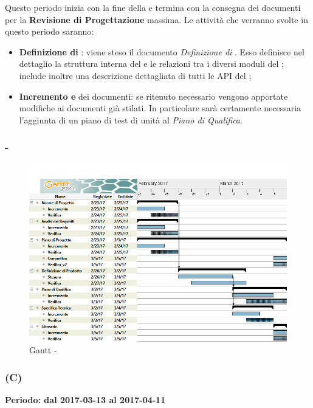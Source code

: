 \documentclass[./PianoDiProgetto.tex]{subfiles}
\begin{document}
  Questo periodo inizia con la fine della \PerPA{} e termina con la consegna dei documenti per la \textbf{Revisione di Progettazione} massima. Le attività che verranno svolte in questo periodo saranno:
  \begin{itemize}
    \item \textbf{Definizione di }: viene steso il documento \textit{Definizione di }. Esso definisce nel dettaglio la struttura interna del  e le relazioni tra i diversi moduli del ; include inoltre una descrizione dettagliata di tutti le API del ;
    \item \textbf{Incremento e } dei documenti: se ritenuto necessario vengono apportate modifiche ai documenti già stilati. In particolare sarà certamente necessaria l'aggiunta di un piano di test di unità al \textit{Piano di Qualifica}.
  \end{itemize}

  \newpage
  \subsubsection{ - \PerPD}
    \begin{figure}[!h]
    \centering
    \includegraphics[width=\textwidth]{images/PD}
    \caption{Gantt - \PerPD}
    \end{figure}

  \subsubsection{\PerC{} (C)}
  \textbf{Periodo: dal 2017-03-13 al 2017-04-11}
\end{document}
